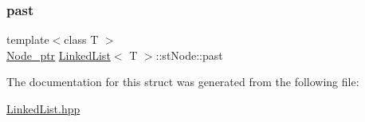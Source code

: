 \subsubsection{\texorpdfstring{past}{past}}
{\footnotesize\ttfamily template$<$class T $>$ \\
\hyperlink{struct_linked_list_1_1st_node_a278875c2a2b254131663e0e3e5e8acd1}{Node\+\_\+ptr} \hyperlink{class_linked_list}{Linked\+List}$<$ T $>$\+::st\+Node\+::past}



The documentation for this struct was generated from the following file\+:\begin{DoxyCompactItemize}
\item 
\hyperlink{_linked_list_8hpp}{Linked\+List.\+hpp}\end{DoxyCompactItemize}
